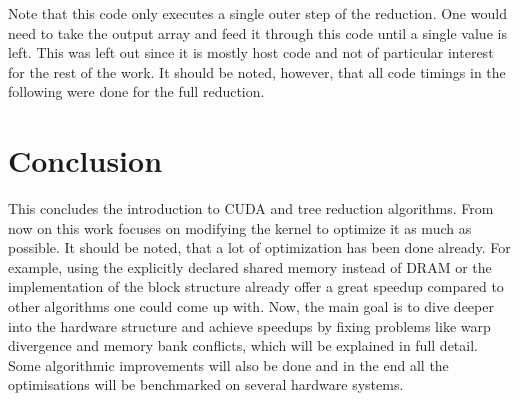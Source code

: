 

Note that this code only executes a single outer step of the reduction.
One would need to take the output array and feed it through this code until a single value is left.
This was left out since it is mostly host code and not of particular interest for the rest of the work.
It should be noted, however, that all code timings in the following were done for the full reduction.

\section{Conclusion}
This concludes the introduction to CUDA and tree reduction algorithms.
From now on this work focuses on modifying the kernel to optimize it as much as possible.
It should be noted, that a lot of optimization has been done already.
For example, using the explicitly declared shared memory instead of DRAM or the implementation of the block structure already offer a great speedup compared to other algorithms one could come up with.
Now, the main goal is to dive deeper into the hardware structure and achieve speedups by fixing problems like warp divergence and memory bank conflicts, which will be explained in full detail.
Some algorithmic improvements will also be done and in the end all the optimisations will be benchmarked on several hardware systems.
